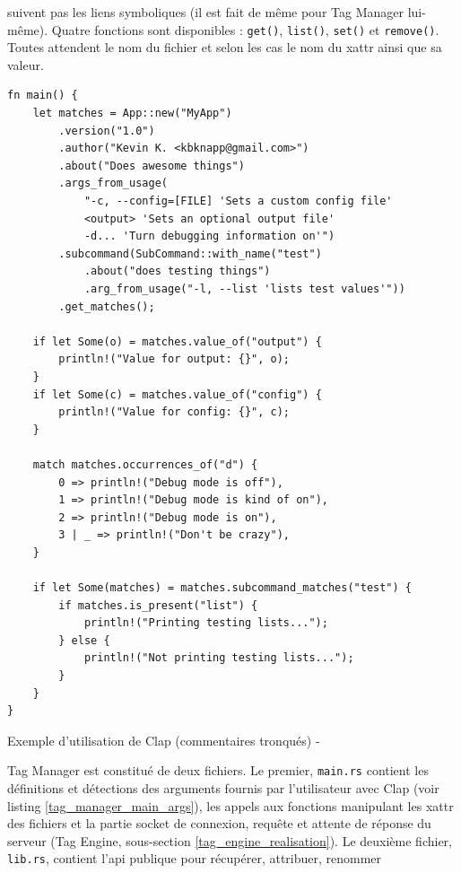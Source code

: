 \documentclass[a4paper, 12pt]{article}
\newenvironment{code}{\captionsetup{type=listing}}{}
\begin{document}
suivent pas les liens symboliques (il est fait de même pour Tag Manager lui-même). Quatre fonctions 
sont disponibles : \texttt{get()}, \texttt{list()}, \texttt{set()} 
et \texttt{remove()}. Toutes attendent le nom du fichier et selon les cas le nom du 
\acrshort{xattr} ainsi que sa valeur.
\bigbreak
\begin{code}
    \begin{verbatim}
fn main() {
    let matches = App::new("MyApp")
        .version("1.0")
        .author("Kevin K. <kbknapp@gmail.com>")
        .about("Does awesome things")
        .args_from_usage(
            "-c, --config=[FILE] 'Sets a custom config file'
            <output> 'Sets an optional output file'
            -d... 'Turn debugging information on'")
        .subcommand(SubCommand::with_name("test")
            .about("does testing things")
            .arg_from_usage("-l, --list 'lists test values'"))
        .get_matches();

    if let Some(o) = matches.value_of("output") {
        println!("Value for output: {}", o);
    }
    if let Some(c) = matches.value_of("config") {
        println!("Value for config: {}", c);
    }

    match matches.occurrences_of("d") {
        0 => println!("Debug mode is off"),
        1 => println!("Debug mode is kind of on"),
        2 => println!("Debug mode is on"),
        3 | _ => println!("Don't be crazy"),
    }

    if let Some(matches) = matches.subcommand_matches("test") {
        if matches.is_present("list") {
            println!("Printing testing lists...");
        } else {
            println!("Not printing testing lists...");
        }
    }
}
    \end{verbatim}
    \caption{Exemple d'utilisation de Clap (commentaires tronqués) - \cite{ref42}}
    \label{tag_manager_clap}
\end{code}
\bigbreak
Tag Manager est constitué de deux fichiers. Le premier, \texttt{main.rs} contient les 
définitions et détections des arguments fournis par l'utilisateur avec Clap (voir listing 
\ref{tag_manager_main_args}), les appels aux fonctions 
manipulant les \acrshort{xattr} des fichiers et la partie socket de connexion, requête et attente 
de réponse du serveur (Tag Engine, sous-section \ref{tag_engine_realisation}). Le deuxième fichier, 
\texttt{lib.rs}, contient l'\acrshort{api} publique pour récupérer, attribuer, renommer 
\end{document}
